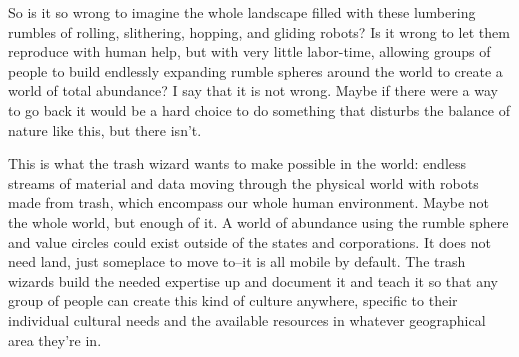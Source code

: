 So is it so wrong to imagine the whole landscape filled with these
lumbering rumbles of rolling, slithering, hopping, and gliding robots?
Is it wrong to let them reproduce with human help, but with very little
labor-time, allowing groups of people to build endlessly expanding
rumble spheres around the world to create a world of total abundance? I
say that it is not wrong. Maybe if there were a way to go back it would
be a hard choice to do something that disturbs the balance of nature
like this, but there isn't.

This is what the trash wizard wants to make possible in the world:
endless streams of material and data moving through the physical world
with robots made from trash, which encompass our whole human
environment. Maybe not the whole world, but enough of it. A world of
abundance using the rumble sphere and value circles could exist outside
of the states and corporations. It does not need land, just someplace to
move to--it is all mobile by default. The trash wizards build the needed
expertise up and document it and teach it so that any group of people
can create this kind of culture anywhere, specific to their individual
cultural needs and the available resources in whatever geographical area
they're in.
